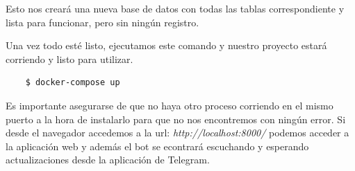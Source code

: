 Esto nos creará una nueva base de datos con todas las tablas correspondiente y lista para funcionar, pero sin ningún registro. 

Una vez todo esté listo, ejecutamos este comando y nuestro proyecto estará corriendo y listo para utilizar.

\begin{verbatim}
    $ docker-compose up
\end{verbatim}

Es importante asegurarse de que no haya otro proceso corriendo en el mismo puerto a la hora de instalarlo para que no nos encontremos con ningún error. Si desde el navegador accedemos a la url: \textit{http://localhost:8000/} podemos acceder a la aplicación web y además el bot se econtrará escuchando y esperando actualizaciones desde la aplicación de Telegram.